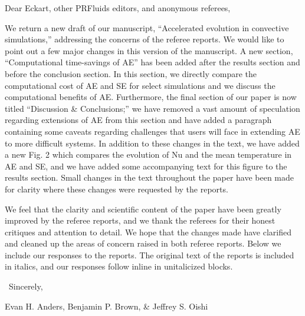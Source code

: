 \documentclass[aps, 11pt, singlecolumn]{revtex4-1} %
\begin{document}
\newenvironment{myquotation}{
\begin{quotation}
\itshape
}{ 
\end{quotation}
}
\noindent
Dear Eckart, other PRFluids editors, and anonymous referees,
$\,$\newline

\begin{singlespace}
We return a new draft of our manuscript, ``Accelerated evolution in
convective simulations,'' addressing the concerns of the referee reports.
We would like to point out a few major changes in this version of the manuscript.
A new section, ``Computational time-savings of AE'' has been added after the
results section and before the conclusion section. In this section, we directly
compare the computational cost of AE and SE for select simulations and we discuss
the computational benefits of AE.  Furthermore, the final section of our paper
is now titled ``Discussion \& Conclusions;'' we have removed a vast amount
of speculation regarding extensions of AE from this section and have added
a paragraph containing some caveats regarding challenges that users will face in
extending AE to more difficult systems.  In addition to these changes in the text,
we have added a new Fig. 2 which compares the evolution of Nu and the
mean temperature in AE and SE, and we have added some accompanying text for this
figure to the results section.  Small changes in the text throughout the paper have
been made for clarity where these changes were requested by the reports.

We feel that the clarity and scientific content of the paper have been greatly
improved by the referee reports, and we thank the referees for their honest 
critiques and attention to detail. We hope that the changes made have clarified
and cleaned up the areas of concern raised in both referee reports.  Below we
include our responses to the reports. The original text of the reports is included
in italics, and our responses follow inline in unitalicized blocks.

$\,$\newline
\noindent
Sincerely,

Evan H. Anders, Benjamin P. Brown, \& Jeffrey S. Oishi





\end{singlespace}
\end{document}
